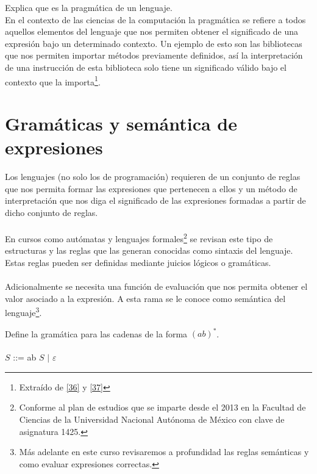     \begin{exercise}
        Explica que es la pragmática de un lenguaje.   \\
         En el contexto de las ciencias de la computación la pragmática se refiere a todos aquellos elementos del lenguaje que nos permiten obtener el significado de una expresión bajo un determinado contexto.
        Un ejemplo de esto son las bibliotecas que nos permiten importar métodos previamente definidos, así la interpretación de una instrucción de esta biblioteca solo tiene un significado válido bajo el contexto que la importa\footnote{Extraído de \hyperlink{36}{[36]} y   \hyperlink{37}{[37]}}.
    \end{exercise} 

    \bigskip

\section{Gramáticas y semántica de expresiones}

    Los lenguajes (no solo los de programación) requieren de un conjunto de reglas que nos permita formar las expresiones que pertenecen a ellos y un método de interpretación que nos diga el significado de las expresiones formadas a partir de dicho conjunto de reglas.\\\\
    En cursos como autómatas y lenguajes formales\footnote{Conforme al plan de estudios que se imparte desde el 2013 en la Facultad de Ciencias de la Universidad Nacional Autónoma de México con clave de asignatura 1425. } se revisan este tipo de estructuras y las reglas que las generan conocidas como sintaxis del  lenguaje. Estas reglas pueden ser definidas mediante juicios lógicos o gramáticas. \\\\
    Adicionalmente se necesita una función de evaluación que nos permita obtener el valor asociado a la expresión. A esta rama se le conoce como semántica del lenguaje\footnote{
    Más adelante en este curso revisaremos a profundidad las reglas semánticas y como evaluar expresiones correctas.}.

    \begin{exercise}
        Define la gramática para las cadenas de la forma $(ab)^*$.     \\\\
            $S$ ::= ab $S$ $|$ $\varepsilon$
    \end{exercise}

